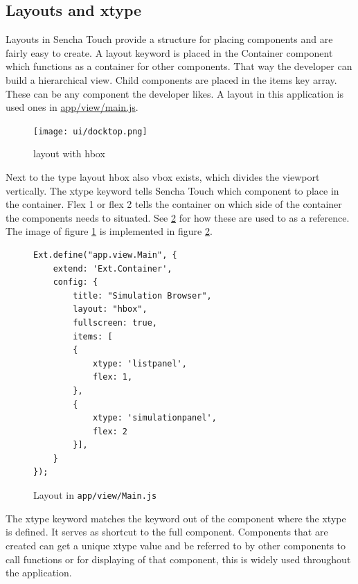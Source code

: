 \subsection{Layouts and xtype}
Layouts in Sencha Touch provide a structure for placing components and are fairly easy to create. A layout keyword is placed in the Container component which functions as a container for other components. That way the developer can build a hierarchical view. Child components are placed in the items key array. These can be any component the developer likes. A layout in this application is used ones in \url{app/view/main.js}. 

\begin{figure}[H]
\center
\texttt{[image: ui/docktop.png]}
\caption{layout with hbox}
\label{fig:layout}
\end{figure}

Next to the type layout hbox also vbox exists, which divides the viewport vertically.  The xtype keyword tells Sencha Touch which component to place in the container. Flex 1 or flex 2 tells the container on which side of the container the components needs to situated. See \ref{fig:layout_impl} for how these are used to as a reference. The image of figure \ref{fig:layout} is implemented in figure \ref{fig:layout_impl}.

\begin{figure}[H]
\begin{lstlisting}
Ext.define("app.view.Main", {
    extend: 'Ext.Container',
    config: {
        title: "Simulation Browser",
        layout: "hbox",
        fullscreen: true,
        items: [
        {
            xtype: 'listpanel',
            flex: 1,
        },
        {    
            xtype: 'simulationpanel',
            flex: 2
        }],
    }
});
\end{lstlisting}
\caption{Layout in \texttt{app/view/Main.js}}
\label{fig:layout_impl}
\end{figure}
The xtype keyword matches the keyword out of the component where the xtype is defined. It serves as shortcut to the full component. Components that are created can get a unique xtype value and be referred to by other components to call functions or for displaying  of that component, this is widely used throughout the application.
 

